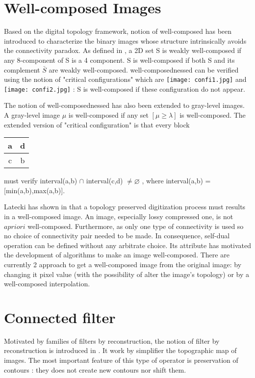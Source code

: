 \section{Well-composed Images}
Based on the digital topology framework, notion of well-composed has been introduced to characterize the binary images whose structure intrinsically avoids the connectivity paradox. As defined in \cite{Latecki95}, a 2D set S is weakly well-composed if any 8-component of S is a 4 component. S is well-composed if both S and its complement $\bar{S}$ are weakly well-composed. well-composednessed can be verified  using the notion of "critical configurations" which are \texttt{[image: confi1.jpg]} and \texttt{[image: confi2.jpg]} : S is well-composed if these configuration do not appear. 
\par
The notion of well-composednessed has also been extended to gray-level images. A gray-level image $\mu$ is well-composed if any set $[\mu \geq \lambda ]$ is well-composed. The extended version of "critical configuration" is that every block 
\begin{tabular}{|c|c|}
\hline 
a & d \\ 
\hline 
c & b \\ 
\hline 
\end{tabular} 
must verify interval(a,b) $\cap$ interval(c,d) $\neq \varnothing$ , where interval(a,b) = [min(a,b),max(a,b)].
\par
Latecki has shown in \cite{Latecki.98.JMIV} that a topology preserved digitization process must results in a well-composed image. An image, especially lossy compressed one, is not $a priori$ well-composed. Furthermore, as only one type of connectivity is used so no choice of connectivity pair needed to be made. In consequence, self-dual operation can be defined without any arbitrate choice. Its attribute has motivated the development of algorithms to make an image well-composed. There are currently 2 approach to get a well-composed image from the original image: by changing it pixel value (with the possibility of alter the image's topology) or by a well-composed interpolation.


\section{Connected filter}
Motivated by families of filters by reconstruction, the notion of filter by reconstruction is introduced in \cite{Salembier95flatzones} \cite{Serra1993}. It work by simplifier the topographic map of images. The most important feature of this type of operator is preservation of contours \cite{Salembier2009}: they does not create new contours nor shift them.
